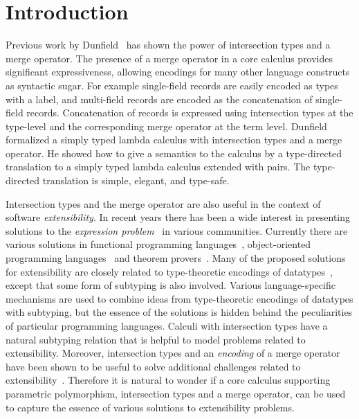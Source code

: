 \section{Introduction}
\label{sec:intro}

Previous work by Dunfield~\cite{dunfield2014elaborating} has shown the power of intersection
types and a merge operator. The presence of a merge operator in a core
calculus provides significant expressiveness, allowing encodings for many
other language constructs as syntactic sugar. For example single-field
records are easily encoded as types with a label, and multi-field
records are encoded as the concatenation of single-field
records. Concatenation of records is expressed using intersection
types at the type-level and the corresponding merge operator at the
term level. Dunfield formalized a simply typed lambda calculus with
intersection types and a merge operator. He showed how to give a
semantics to the calculus by a type-directed translation to a simply
typed lambda calculus extended with pairs. The type-directed
translation is simple, elegant, and type-safe.

Intersection types and the merge operator are also useful in the
context of software \emph{extensibility}. In recent years there has
been a wide interest in presenting solutions to the \emph{expression
  problem}~\cite{wadler1998expression} in various
communities. Currently there are various solutions in functional
programming languages~\cite{swierstra:la-carte,emgm}, object-oriented
programming
languages~\cite{togersen:2004,Zenger-Odersky2005,oliveira09modular,oliveira2012extensibility}
and theorem provers~\cite{DelawareOS13,SchwaabS13}.
Many of the proposed solutions for extensibility are closely related
to type-theoretic encodings of datatypes~\cite{BoehmBerarducci},
except that some form of subtyping is also involved.  Various
language-specific mechanisms are used to combine ideas from
type-theoretic encodings of datatypes with subtyping, but the essence
of the solutions is hidden behind the peculiarities of particular
programming languages.  Calculi with intersection types have a natural
subtyping relation that is helpful to model problems related to
extensibility.  Moreover, intersection types and an \emph{encoding} of
a merge operator have been shown to be useful to solve additional
challenges related to extensibility~\cite{oliveira2013feature}.
Therefore it is natural to wonder if a
core calculus supporting parametric polymorphism,
intersection types and a merge operator, can be used to capture the
essence of various solutions to extensibility problems.

